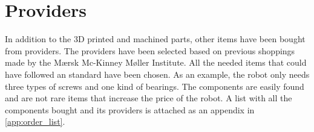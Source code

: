 \section{Providers} %
\label{sec:providers}
In addition to the 3D printed and machined parts, other items have been bought from providers.
The providers have been selected based on previous shoppings made by the Mærsk Mc-Kinney Møller Institute.
All the needed items that could have followed an standard have been chosen. 
As an example, the robot only needs three types of screws and one kind of bearings.
The components are easily found and are not rare items that increase the price of the robot.
A list with all the components bought and its providers is attached as an appendix in \ref{app:order_list}.
